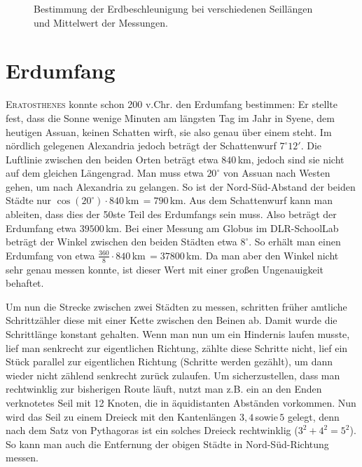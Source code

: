 \documentclass[12pt,a4paper,headinclude,bibtotoc]{scrartcl}
\begin{document}
\begin{figure}[!htb]
	\centering
	
	\caption{Bestimmung der Erdbeschleunigung bei verschiedenen Seillängen und Mittelwert der Messungen.}
	\label{fig:gbesch}
\end{figure}



\section{Erdumfang}
\textsc{Eratosthenes} konnte schon 200 v.Chr. den Erdumfang bestimmen:
Er stellte fest, dass die Sonne wenige Minuten am längsten Tag im Jahr in Syene, dem heutigen Assuan, keinen Schatten wirft, sie also genau über einem steht. Im nördlich gelegenen Alexandria jedoch beträgt der Schattenwurf $7^\circ12'$.
Die Luftlinie zwischen den beiden Orten beträgt etwa $840\,$km, jedoch sind sie nicht auf dem gleichen Längengrad. Man muss etwa $20^\circ$ von Assuan nach Westen gehen, um nach Alexandria zu gelangen.
So ist der Nord-Süd-Abstand der beiden Städte nur $\cos(20^\circ) \cdot 840\,$km$\,= 790\,$km.
Aus dem Schattenwurf kann man ableiten, dass dies der 50ste Teil des Erdumfangs sein muss.
Also beträgt der Erdumfang etwa $39500\,$km.
Bei einer Messung am Globus im DLR-SchoolLab beträgt der Winkel zwischen den beiden Städten etwa $8^\circ$.
So erhält man einen Erdumfang von etwa $\frac{360}{8} \cdot 840\,$km$\,=37800\,$km.
Da man aber den Winkel nicht sehr genau messen konnte, ist dieser Wert mit einer großen Ungenauigkeit behaftet.


Um nun die Strecke zwischen zwei Städten zu messen, schritten früher amtliche Schrittzähler diese mit einer Kette zwischen den Beinen ab.
Damit wurde die Schrittlänge konstant gehalten.
Wenn man nun um ein Hindernis laufen musste, lief man senkrecht zur eigentlichen Richtung, zählte diese Schritte nicht, lief ein Stück parallel  zur eigentlichen Richtung (Schritte werden gezählt), um dann wieder nicht zählend senkrecht zurück zulaufen.
Um sicherzustellen, dass man rechtwinklig zur bisherigen Route läuft, nutzt man z.B. ein an den Enden verknotetes Seil mit 12 Knoten, die in äquidistanten Abständen vorkommen.
Nun wird das Seil zu einem Dreieck mit den Kantenlängen $3,4\,$sowie$\,5$ gelegt, denn nach dem Satz von Pythagoras ist ein solches Dreieck rechtwinklig ($3^2+4^2=5^2$).
So kann man auch die Entfernung der obigen Städte in Nord-Süd-Richtung messen.
\end{document}
